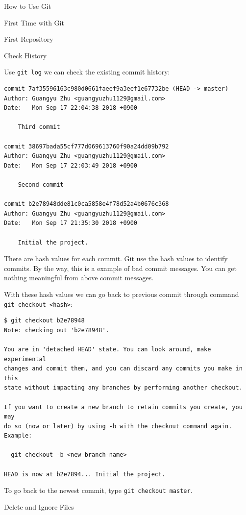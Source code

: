 \documentclass[12pt, a4papaer]{article}
\begin{document}
\begin{section}{How to Use Git}
\begin{subsection}{First Time with Git}
\begin{subsubsection}{First Repository}
\begin{paragraph}{Check History\\}
    
Use \verb|git log| we can check the existing commit history:

\begin{lstlisting}
commit 7af35596163c980d0661faeef9a3eef1e67732be (HEAD -> master)
Author: Guangyu Zhu <guangyuzhu1129@gmail.com>
Date:   Mon Sep 17 22:04:38 2018 +0900

    Third commit

commit 38697bada55cf777d069613760f90a24dd09b792
Author: Guangyu Zhu <guangyuzhu1129@gmail.com>
Date:   Mon Sep 17 22:03:49 2018 +0900

    Second commit

commit b2e78948dde81c0ca5858e4f78d52a4b0676c368
Author: Guangyu Zhu <guangyuzhu1129@gmail.com>
Date:   Mon Sep 17 21:35:30 2018 +0900

    Initial the project.
\end{lstlisting}

There are hash values for each commit. Git use the hash values to identify
commits. By the way, this is a example of bad commit messages. You can get
nothing meaningful from above commit messages.

With these hash values we can go back to previous commit through command
\verb|git checkout <hash>|:

\begin{lstlisting}
$ git checkout b2e78948
Note: checking out 'b2e78948'.

You are in 'detached HEAD' state. You can look around, make experimental
changes and commit them, and you can discard any commits you make in this
state without impacting any branches by performing another checkout.

If you want to create a new branch to retain commits you create, you may
do so (now or later) by using -b with the checkout command again. Example:

  git checkout -b <new-branch-name>

HEAD is now at b2e7894... Initial the project.
\end{lstlisting}

To go back to the newest commit, type \verb|git checkout master|.

\end{paragraph}
\end{subsubsection}

\begin{subsubsection}{Delete and Ignore Files}


\end{subsubsection}
\end{subsection}
\end{section}
\end{document}

